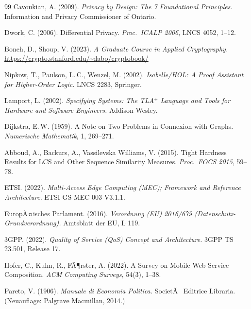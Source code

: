 ﻿\documentclass[a4paper,12pt]{article}
\theoremstyle{definition}
\begin{document}
\begin{thebibliography}{99}
Cavoukian, A. (2009). \textit{Privacy by Design: The 7 Foundational Principles.} Information and Privacy Commissioner of Ontario.

Dwork, C. (2006). Differential Privacy. \textit{Proc.\ ICALP 2006}, LNCS 4052, 1--12.

Boneh, D., Shoup, V. (2023). \textit{A Graduate Course in Applied Cryptography.} \url{https://crypto.stanford.edu/~dabo/cryptobook/}

Nipkow, T., Paulson, L.\,C., Wenzel, M. (2002). \textit{Isabelle/HOL: A Proof Assistant for Higher-Order Logic.} LNCS 2283, Springer.

Lamport, L. (2002). \textit{Specifying Systems: The TLA$^+$ Language and Tools for Hardware and Software Engineers.} Addison-Wesley.

Dijkstra, E.\,W. (1959). A Note on Two Problems in Connexion with Graphs. \textit{Numerische Mathematik}, 1, 269--271.

Abboud, A., Backurs, A., Vassilevska Williams, V. (2015). Tight Hardness Results for LCS and Other Sequence Similarity Measures. \textit{Proc.\ FOCS 2015}, 59--78.

ETSI. (2022). \textit{Multi-Access Edge Computing (MEC); Framework and Reference Architecture.} ETSI GS MEC 003 V3.1.1.

EuropÃ¤isches Parlament. (2016). \textit{Verordnung (EU) 2016/679 (Datenschutz-Grundverordnung).} Amtsblatt der EU, L 119.

3GPP. (2022). \textit{Quality of Service (QoS) Concept and Architecture.} 3GPP TS 23.501, Release 17.

Hofer, C., Kuhn, R., FÃ¶rster, A. (2022). A Survey on Mobile Web Service Composition. \textit{ACM Computing Surveys}, 54(3), 1--38.

Pareto, V. (1906). \textit{Manuale di Economia Politica.} SocietÃ  Editrice Libraria. (Neuauflage: Palgrave Macmillan, 2014.)

\end{thebibliography}
\end{document}
